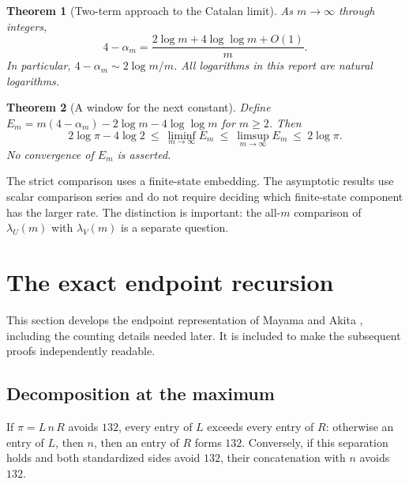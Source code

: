 \documentclass[11pt,a4paper]{article}
\newtheorem{theorem}{Theorem}[section]
\theoremstyle{definition}\newaliascnt{definition}{theorem}
\theoremstyle{remark}\newaliascnt{remark}{theorem}
\begin{document}
\begin{theorem}[Two-term approach to the Catalan limit]\label{thm:asympt-main}
As $m\to\infty$ through integers,
\begin{equation}
 4-\alpha_m=\frac{2\log m+4\log\log m+O(1)}{m}.
 \label{eq:main-asympt}
\end{equation}
In particular, $4-\alpha_m\sim2\log m/m$. All logarithms in this report are
natural logarithms.
\end{theorem}

\begin{theorem}[A window for the next constant]\label{thm:window-main}
Define $E_m=m(4-\alpha_m)-2\log m-4\log\log m$ for $m\ge2$. Then
\begin{equation}
 2\log\pi-4\log2
 \ \le\ \liminf_{m\to\infty}E_m
 \ \le\ \limsup_{m\to\infty}E_m
 \ \le\ 2\log\pi.
 \label{eq:constant-window}
\end{equation}
No convergence of $E_m$ is asserted.
\end{theorem}

The strict comparison uses a finite-state embedding. The asymptotic results
use scalar comparison series and do not require deciding which finite-state
component has the larger rate. The distinction is important: the all-$m$
comparison of $\lambda_U(m)$ with $\lambda_V(m)$ is a separate question.

\section{The exact endpoint recursion}
\label{sec:endpoints}
This section develops the endpoint representation of Mayama and Akita
\cite[Section~2]{MayamaAkita}, including the counting details needed later.
It is included to make the subsequent proofs independently readable.

\subsection{Decomposition at the maximum}
If $\pi=L\,n\,R$ avoids $132$, every entry of $L$ exceeds every entry of $R$:
otherwise an entry of $L$, then $n$, then an entry of $R$ forms $132$.
Conversely, if this separation holds and both standardized sides avoid
$132$, their concatenation with $n$ avoids $132$.
\end{document}
